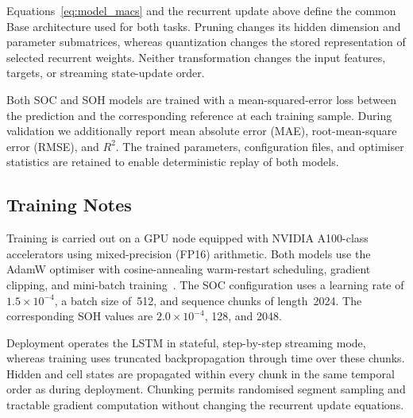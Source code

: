 \documentclass[review]{elsarticle}
\begin{document}
Equations~\eqref{eq:model_macs} and the recurrent update above define the common Base architecture used for both tasks. Pruning changes its hidden dimension and parameter submatrices, whereas quantization changes the stored representation of selected recurrent weights. Neither transformation changes the input features, targets, or streaming state-update order.

Both SOC and SOH models are trained with a mean-squared-error loss between the prediction and the corresponding reference at each training sample. During validation we additionally report mean absolute error (MAE), root-mean-square error (RMSE), and $R^2$. The trained parameters, configuration files, and optimiser statistics are retained to enable deterministic replay of both models.
\subsection{Training Notes}
Training is carried out on a GPU node equipped with NVIDIA A100-class accelerators using mixed-precision (FP16) arithmetic. Both models use the AdamW optimiser with cosine-annealing warm-restart scheduling, gradient clipping, and mini-batch training~\cite{loshchilovDecoupledWeightDecay2017,loshchilovSGDRStochasticGradient2016,micikeviciusMixedPrecisionTraining2017,pascanuDifficultyTrainingRecurrent2012}. The SOC configuration uses a learning rate of $1.5\times10^{-4}$, a batch size of~512, and sequence chunks of length~2024. The corresponding SOH values are $2.0\times10^{-4}$, 128, and 2048.

Deployment operates the LSTM in stateful, step-by-step streaming mode, whereas training uses truncated backpropagation through time over these chunks. Hidden and cell states are propagated within every chunk in the same temporal order as during deployment. Chunking permits randomised segment sampling and tractable gradient computation without changing the recurrent update equations.
\end{document}
